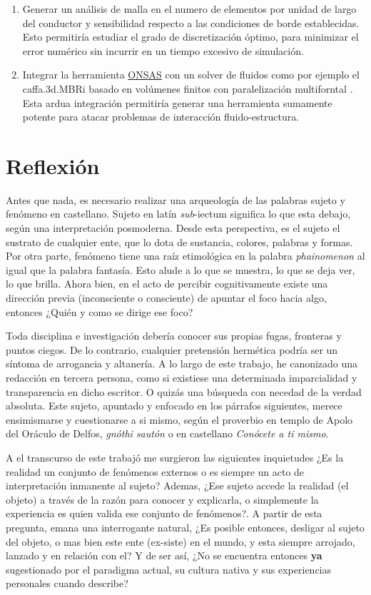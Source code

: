 \begin{enumerate}
	\item Generar un análisis de malla en el numero de elementos por unidad de largo del conductor y sensibilidad respecto a las condiciones de borde establecidas. Esto permitiría estudiar el grado de discretización óptimo, para minimizar el error numérico sin incurrir en un tiempo excesivo de simulación. 
	\item Integrar la herramienta \href{https://github.com/ONSAS/ONSAS/}{ONSAS} con un solver de fluidos como por ejemplo el caffa.3d.MBRi basado en volúmenes finitos con paralelización multiforntal \cite{mendina2014general}. Esta ardua integración permitiría generar una herramienta sumamente potente para atacar problemas de interacción fluido-estructura.	
\end{enumerate}

\section{Reflexión}


Antes que nada, es necesario realizar una arqueología de las palabras sujeto y fenómeno en castellano. Sujeto en latín \emph{sub}-{iectum} significa lo que esta debajo, según una interpretación posmoderna. Desde esta perspectiva, es el sujeto el sustrato de cualquier ente, que lo dota de sustancia, colores, palabras y formas. Por otra parte, fenómeno tiene una raíz etimológica en la palabra \emph{phainomenon} al igual que la palabra fantasía. Esto alude a lo que se muestra, lo que se deja ver, lo que brilla. Ahora bien, en el acto de percibir cognitivamente existe una dirección previa (inconsciente o consciente) de apuntar el foco hacia algo, entonces ¿Quién y como se dirige ese foco?

Toda disciplina e investigación debería conocer sus propias fugas, fronteras y puntos ciegos. De lo contrario, cualquier pretensión hermética podría ser un síntoma de arrogancia y altanería.  A lo largo de este trabajo, he canonizado una redacción en tercera persona, como si existiese una determinada imparcialidad y transparencia en dicho escritor. O quizás una búsqueda con necedad de la verdad absoluta. Este sujeto, apuntado y enfocado en los párrafos siguientes, merece ensimismarse y cuestionarse a si mismo, según el proverbio en templo de Apolo del Oráculo de Delfos, \emph{gnóthi sautón} o en castellano \emph{Conócete a ti mismo}.

A el transcurso de este trabajó me surgieron las siguientes inquietudes ¿Es la realidad un conjunto de fenómenos externos o es siempre un acto de interpretación inmanente al sujeto? Ademas, ¿Ese sujeto accede la realidad (el objeto) a través de la razón para conocer y explicarla, o simplemente la experiencia es quien valida ese conjunto de fenómenos?. A partir de esta pregunta, emana una interrogante natural, ¿Es posible entonces, desligar al sujeto del objeto, o mas bien este ente (ex-siste) en el mundo, y esta siempre arrojado, lanzado y en relación con el? Y de ser así, ¿No se encuentra entonces \textbf{ya} sugestionado por el paradigma actual, su cultura nativa y sus experiencias personales cuando describe?

